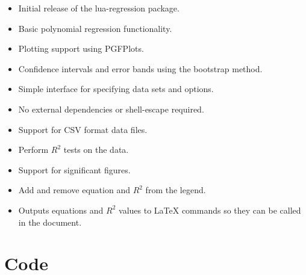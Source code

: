 \documentclass[11pt]{article}
\begin{document}
    \begin{itemize}
        \item Initial release of the {\ttfamily lua-regression} package.
        \item Basic polynomial regression functionality.
        \item Plotting support using PGFPlots.
        \item Confidence intervals and error bands using the bootstrap method.
        \item Simple interface for specifying data sets and options.
        \item No external dependencies or {\ttfamily shell-escape} required.
        \item Support for CSV format data files.
        \item Perform $R^2$ tests on the data.
        \item Support for significant figures.
        \item Add and remove equation and $R^2$ from the legend.
        \item Outputs equations and $R^2$ values to LaTeX commands so they can be called in the document.
    \end{itemize}

    \pagebreak

    \section{Code}

    \inputminted[autogobble, breaklines, breakanywhere, firstline=22, linenos]{latex}{../tex/lua-regression.sty}
\end{document}
